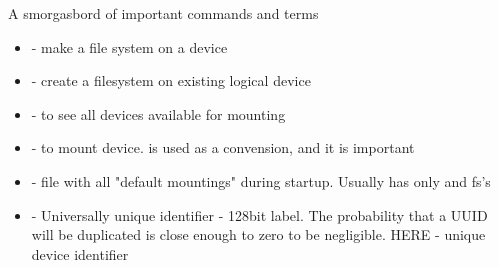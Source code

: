 \documentclass[usenames,dvipsnames,10pt,aspectratio=169]{beamer}
\begin{document}

\begin{frame}{A smorgasbord of important commands and terms}
    \begin{itemize}
        \item {} - make a file system on a device
        \item {} - create a filesystem on existing logical device
        \item {} - to see all devices available for mounting 
        \item {} - to mount device. is used as a convension, and it is important
        \item {}- file with all "default mountings" during startup. Usually has only \ex{/} and  fs's
        \item {} - Universally unique identifier - 128bit label. The probability that a UUID will be duplicated is close enough to zero to be negligible. HERE - unique device identifier
    \end{itemize}
\end{frame}
\end{document}
